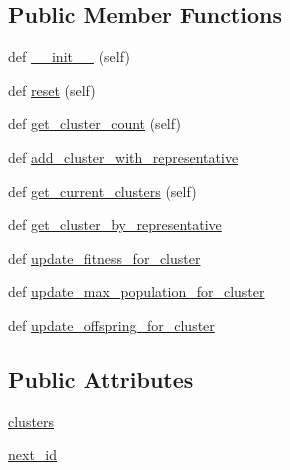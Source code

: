 \subsection*{Public Member Functions}
\begin{DoxyCompactItemize}
\item 
def \hyperlink{classNEAT__PyGenetics_1_1NEAT_1_1Tests_1_1MockClasses_1_1mock__ClusterRepository_1_1mock__ClusterRepository_a9f89fd3f00cd01d78dcae1af7b061c8a}{\+\_\+\+\_\+init\+\_\+\+\_\+} (self)
\item 
def \hyperlink{classNEAT__PyGenetics_1_1NEAT_1_1Tests_1_1MockClasses_1_1mock__ClusterRepository_1_1mock__ClusterRepository_a7c1d0e1494945daece920c3faa393417}{reset} (self)
\item 
def \hyperlink{classNEAT__PyGenetics_1_1NEAT_1_1Tests_1_1MockClasses_1_1mock__ClusterRepository_1_1mock__ClusterRepository_aaedaee0f127d37e0c3a5521f15364277}{get\+\_\+cluster\+\_\+count} (self)
\item 
def \hyperlink{classNEAT__PyGenetics_1_1NEAT_1_1Tests_1_1MockClasses_1_1mock__ClusterRepository_1_1mock__ClusterRepository_a226b6c12fc2b76219c55c9e4b99baa16}{add\+\_\+cluster\+\_\+with\+\_\+representative}
\item 
def \hyperlink{classNEAT__PyGenetics_1_1NEAT_1_1Tests_1_1MockClasses_1_1mock__ClusterRepository_1_1mock__ClusterRepository_a134f5b068a5237328c7c3b481852bafd}{get\+\_\+current\+\_\+clusters} (self)
\item 
def \hyperlink{classNEAT__PyGenetics_1_1NEAT_1_1Tests_1_1MockClasses_1_1mock__ClusterRepository_1_1mock__ClusterRepository_abeb34604f2a2aa59c79c0db965494929}{get\+\_\+cluster\+\_\+by\+\_\+representative}
\item 
def \hyperlink{classNEAT__PyGenetics_1_1NEAT_1_1Tests_1_1MockClasses_1_1mock__ClusterRepository_1_1mock__ClusterRepository_aee0e3e9834f04db0768aefa4949fecdf}{update\+\_\+fitness\+\_\+for\+\_\+cluster}
\item 
def \hyperlink{classNEAT__PyGenetics_1_1NEAT_1_1Tests_1_1MockClasses_1_1mock__ClusterRepository_1_1mock__ClusterRepository_a750492b84023bed8ca6f78ccda904de5}{update\+\_\+max\+\_\+population\+\_\+for\+\_\+cluster}
\item 
def \hyperlink{classNEAT__PyGenetics_1_1NEAT_1_1Tests_1_1MockClasses_1_1mock__ClusterRepository_1_1mock__ClusterRepository_ac6f8854ca405235c472100f1b9519762}{update\+\_\+offspring\+\_\+for\+\_\+cluster}
\end{DoxyCompactItemize}
\subsection*{Public Attributes}
\begin{DoxyCompactItemize}
\item 
\hyperlink{classNEAT__PyGenetics_1_1NEAT_1_1Tests_1_1MockClasses_1_1mock__ClusterRepository_1_1mock__ClusterRepository_a2e2d77ba5375cceedf179e25c7887de5}{clusters}
\item 
\hyperlink{classNEAT__PyGenetics_1_1NEAT_1_1Tests_1_1MockClasses_1_1mock__ClusterRepository_1_1mock__ClusterRepository_a3b7a06a95cca18e535ce14621cd4fa4d}{next\+\_\+id}
\end{DoxyCompactItemize}


